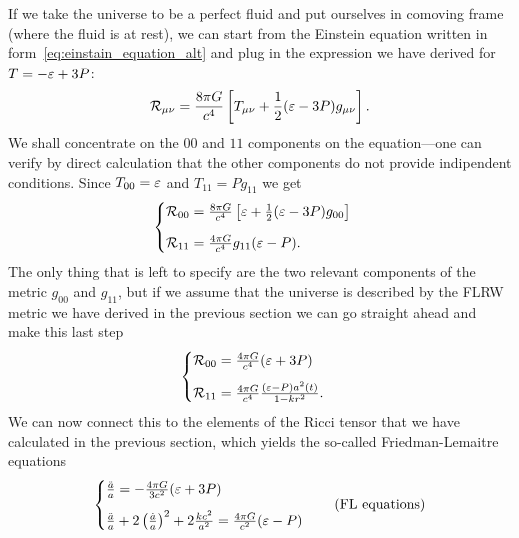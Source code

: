 If we take the universe to be a perfect fluid
and put ourselves in comoving frame (where the fluid is at rest), we can start from
the Einstein equation written in form~\eqref{eq:einstain_equation_alt} and plug
in the expression we have derived for $T = -\varepsilon + 3P$:
\begin{align*}
  \ricci{\mu\nu} = %
  \frac{8\pi G}{c^4} \left[ T_{\mu\nu} + \frac{1}{2}(\edensity - 3\pressure)g_{\mu\nu} \right].
\end{align*}
We shall concentrate on the $00$ and $11$ components on the equation---one can verify
by direct calculation that the other components do not provide indipendent conditions.
Since $T_{00} = \varepsilon$ and $T_{11} = P g_{11}$ we get
\begin{align*}
  \begin{cases}
  \mathcal{R}_{00} = \frac{8\pi G}{c^4}
  \left[ \varepsilon + \frac{1}{2} (\varepsilon - 3P)g_{00} \right]\\[8pt]
  \mathcal{R}_{11} = \frac{4\pi G}{c^4} g_{11} (\varepsilon - P).
  \end{cases}
\end{align*}
The only thing that is left to specify are the two relevant components of the metric
$g_{00}$ and $g_{11}$, but if we assume that the universe is described by the
FLRW metric we have derived in the previous section we can go straight ahead and
make this last step
\begin{align*}
  \begin{cases}
  \mathcal{R}_{00} = \frac{4\pi G}{c^4} (\varepsilon + 3P) \\[8pt]
  \mathcal{R}_{11} = \frac{4\pi G}{c^4} \frac{(\varepsilon - P) a^2(t)}{1 - kr^2}.
\end{cases}
\end{align*}
We can now connect this to the elements of the Ricci tensor that we have calculated
in the previous section, which yields the so-called Friedman-Lemaitre equations
\begin{align}
  \begin{cases}
    \frac{\ddot{a}}{a} = -\frac{4\pi G}{3c^2}(\varepsilon + 3P) \\[8pt]
    \frac{\ddot{a}}{a} + 2 \left(\frac{\dot{a}}{a}\right)^2 + 2\frac{k c^2}{a^2} =
    \frac{4\pi G}{c^2} (\varepsilon - P)
  \end{cases}\quad\text{(FL equations)}
\end{align}

